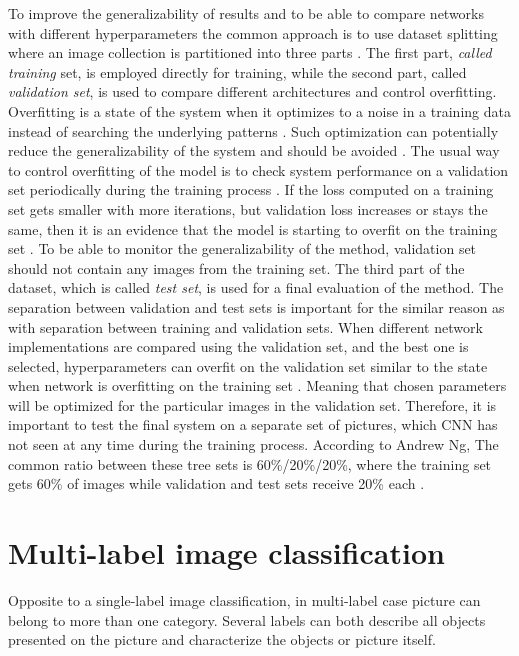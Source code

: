 To improve the generalizability of results and to be able to compare networks with different hyperparameters the common approach is to use dataset splitting where an image collection is partitioned into three parts \cite{cs231n-cls}. The first part, \textit{called training} set, is employed directly for training, while the second part, called \textit{validation set}, is used to compare different architectures and control overfitting.  Overfitting is a state of the system when it optimizes to a noise in a training data instead of searching the underlying patterns \cite{cs231n-nn1}. Such optimization can potentially reduce the generalizability of the system and should be avoided \cite{cs231n-nn1}. The usual way to control overfitting of the model is to check system performance on a validation set periodically during the training process \cite{cs231n-nn3}. If the loss computed on a training set gets smaller with more iterations, but validation loss increases or stays the same, then it is an evidence that the model is starting to overfit on the training set \cite{cs231n-nn3}. To be able to monitor the generalizability of the method, validation set should not contain any images from the training set. The third part of the dataset, which is called \textit{test set}, is used for a final evaluation of the method. The separation between validation and test sets is important for the similar reason as with separation between training and validation sets. When different network implementations are compared using the validation set, and the best one is selected, hyperparameters can overfit on the validation set similar to the state when network is overfitting on the training set \cite{cs231n-cls}. Meaning that chosen parameters will be optimized for the particular images in the validation set. Therefore, it is important to test the final system on a separate set of pictures, which CNN has not seen at any time during the training process. According to Andrew Ng, The common ratio between these tree sets is 60\%/20\%/20\%, where the training set gets 60\% of images while validation and test sets receive 20\% each \cite{Ng2016NutsLearning}.

\section{Multi-label image classification}
Opposite to a single-label image classification, in multi-label case picture can belong to more than one category. Several labels can both describe all objects presented on the picture and characterize the objects or picture itself.

